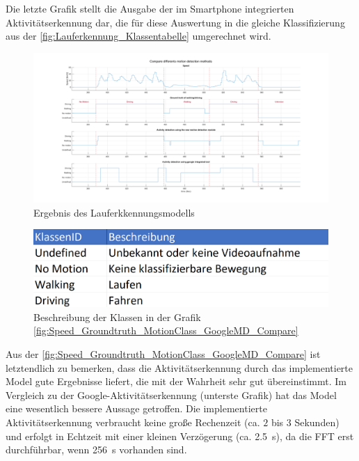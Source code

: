 Die letzte Grafik stellt die Ausgabe der im Smartphone integrierten Aktivitäts\-erkenn\-ung dar, die für diese Auswertung in die gleiche Klassifizierung aus der \autoref{fig:Lauferkennung_Klassentabelle} umgerechnet wird.

\begin{figure}
	\centering
	\includegraphics[width=\linewidth]{Bilder/Speed_Groundtruth_MotionClass_GoogleMD_Compare.png}
	\caption{Ergebnis des Lauferkkennungsmodells}
	\label{fig:Speed_Groundtruth_MotionClass_GoogleMD_Compare}
\end{figure}

\begin{figure}
	\centering
	\includegraphics[width=0.6\linewidth]{Bilder/Lauferkennung_Klassentabelle.png}
	\caption{Beschreibung der Klassen in der Grafik \autoref{fig:Speed_Groundtruth_MotionClass_GoogleMD_Compare}}
	\label{fig:Lauferkennung_Klassentabelle}
\end{figure}

Aus der \autoref{fig:Speed_Groundtruth_MotionClass_GoogleMD_Compare} ist letztendlich zu bemerken, dass die Aktivitäts\-erkenn\-ung durch das implementierte Model gute Ergebnisse liefert, die mit der Wahrheit sehr gut übereinstimmt. Im Vergleich zu der Google-Aktivitäts\-erkenn\-ung (unterste Grafik) hat das Model eine wesentlich bessere Aussage getroffen. Die implementierte Aktivitätserkennung verbraucht keine große Rechenzeit (ca. $2$ bis $3$ Sekunden) und erfolgt in Echtzeit mit einer kleinen Verzögerung (ca. \SI{2,5}{\second}), da die FFT erst durchführbar, wenn \SI{256}{\second} vorhanden sind.



